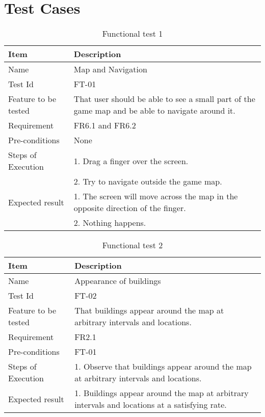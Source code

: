 \section{Test Cases}

\begin{table}[H]
\centering
	\begin{tabular}{ l | p{8cm} }
		\hline
		{\bf Item} & {\bf Description} \\ \hline
		Name & Map and Navigation \\ 
		Test Id & FT-01 \\ 
		Feature to be tested & That user should be able to see a small part of the game map and be able to navigate around it.\\ 
		Requirement & FR6.1 and FR6.2 \\ 
		Pre-conditions & None \\ 
		Steps of Execution & 1. Drag a finger over the screen. \\
		& 2. Try to navigate outside the game map. \\
		Expected result & 1. The screen will move across the map in the opposite direction of the finger.\\ 
		& 2. Nothing happens. \\
	\end{tabular}
	\caption{Functional test 1}
\end{table}

\begin{table}[H]
\centering
	\begin{tabular}{ l | p{8cm} }
		\hline
		{\bf Item} & {\bf Description} \\ \hline
		Name & Appearance of buildings \\ 
		Test Id & FT-02 \\ 
		Feature to be tested & That buildings appear around the map at arbitrary intervals and locations. \\ 
		Requirement & FR2.1 \\ 
		Pre-conditions & FT-01 \\ 
		Steps of Execution & 1. Observe that buildings appear around the map at arbitrary intervals and locations.\\ 
		Expected result & 1. Buildings appear around the map at arbitrary intervals and locations at a satisfying rate.\\ 
	\end{tabular}
	\caption{Functional test 2}
\end{table}

